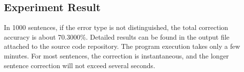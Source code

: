 \documentclass{article}
\begin{document}
\subsection{Experiment Result}

In 1000 sentences, if the error type is not distinguished, the total
correction accuracy is about 70.3000\%. Detailed results can be found
in the output file attached to the source code repository. The program
execution takes only a few minutes. For most sentences, the correction
is instantaneous, and the longer sentence correction will not exceed
several seconds.



\end{document}
